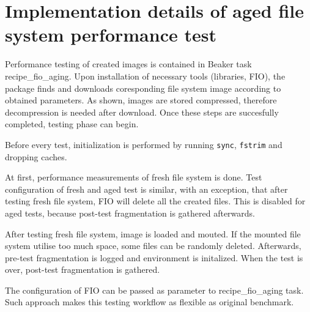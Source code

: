 \documentclass[
  color, %
  table, %
  lof,   %
  lot,   %
]{fithesis3}
\begin{document}




\section{Implementation details of aged file system performance test}
Performance testing of created images is contained in Beaker task recipe\_fio\_aging. Upon installation of necessary tools (libraries, FIO), the package finds and downloads coresponding file system image according to obtained parameters. As shown, images are stored compressed, therefore decompression is needed after download. Once these steps are succesfully completed, testing phase can begin.

Before every test, initialization is performed by running \texttt{sync}, \texttt{fstrim} and dropping caches.

At first, performance measurements of fresh file system is done. Test configuration of fresh and aged test is similar, with an exception, that after testing fresh file system, FIO will delete all the created files. This is disabled for aged tests, because post-test fragmentation is gathered afterwards.

After testing fresh file system, image is loaded and mouted. If the mounted file system utilise too much space, some files can be randomly deleted. Afterwards, pre-test fragmentation is logged and environment is initalized. When the test is over, post-test fragmentation is gathered.

The configuration of FIO can be passed as parameter to recipe\_fio\_aging task. Such approach makes this testing workflow as flexible as original benchmark.
\end{document}
